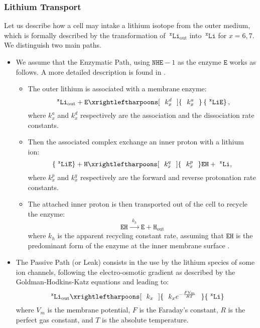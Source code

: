 \documentclass[aps,onecolumn,11pt]{revtex4}
\newcommand{\mychem}[1]{\mathtt{#1}}
\newcommand{\spLi}[1]{{~^{\mychem{#1}}\mychem{Li}}}
\newcommand{\spEout}{\mychem{E}}
\newcommand{\spLiE}[1]{\left\lbrace\spLi{#1}\spEout\right\rbrace}
\newcommand{\spLiOut}[1]{{\spLi{#1}}_{\mathrm{out}}}
\newcommand{\spEHin}{\mychem{EH}}
\newcommand{\spproton}{\mychem{H}}
\newcommand{\NHE}[1]{\mychem{NHE}{\!-\!#1}}
\newcommand{\todo}[1]{\framebox{\textbf{\color{WildStrawberry}{#1}}}}
\begin{document}
\subsubsection{Lithium Transport}

Let us describe how a cell may intake a lithium isotope from the outer medium, which is formally described by the transformation
of $\spLiOut{x}$ into $\spLi{x}$ for $x=6,7$. We distinguish two main paths.

\begin{itemize}
\item We assume that the Enzymatic Path, using $\NHE{1}$ as the enzyme $\spEout$ works as follows. A more detailed description is found in \todo{ref}.
	\begin{itemize}
	\item The outer lithium is associated with a membrane enzyme:
	\begin{equation}
		\label{eq:pre}
		\spLiOut{x} + \spEout  \xrightleftharpoons[~~k^d_x~~]{~~k^a_x~~} \spLiE{x},
	\end{equation}
	where $k^a_x$ and $k^d_x$ respectively are the association and the dissociation rate constants.
	
	\item Then the associated complex exchange an inner proton with a lithium ion:
	\begin{equation}
		\label{eq:xch}
		\spLiE{x} + \spproton   \xrightleftharpoons[~~k^q_x~~]{~~k^p_x~~}   \spEHin + \spLi{x}, 
	\end{equation}
	where $k^p_x$ and $k^q_x$ respectively are the forward and reverse protonation rate constants.
	
	\item The attached inner proton is then transported out of the cell to recycle the enzyme:
	\begin{equation}
			\spEHin   \xrightarrow{~~k_h~~}   \spEout + \spproton_{\mathrm{out}} 
	\end{equation}	
	where $k_h$ is the  apparent recycling constant rate, assuming that $\spEHin$ is the predominant form of the enzyme at the inner membrane surface \todo{Lacroix EMBO 2004 fig 3A}.
	\end{itemize}

\item The Passive Path (or Leak) consists in the use by the lithium species of some ion channels, following the electro-osmotic gradient as described by the Goldman-Hodkins-Katz \todo{ref} equations and leading to:
	\begin{equation}
	\label{eq:ghk}
		\spLiOut{x} \xrightleftharpoons[~~k_x~~]{~~k_x e^{-\frac{FV_m}{RT}}~~}   \spLi{x} 
	\end{equation}
where $V_m$ is the membrane potential, $F$ is the Faraday's constant, $R$ is the perfect gas constant, and $T$ is the absolute temperature.

\end{itemize}
\end{document}
